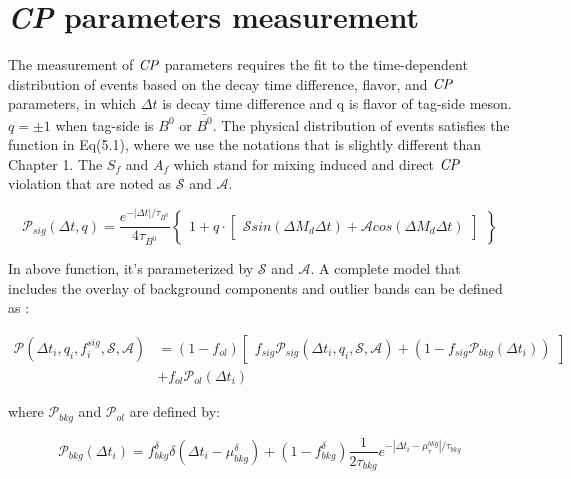 \chapter{\textit{CP} parameters measurement}
The measurement of $\it{CP}$ parameters requires the fit to the time-dependent distribution of events based on the decay time difference, flavor, and $\it{CP}$ parameters, in which $\Delta t$ is decay time difference and q is flavor of tag-side meson. $q = \pm 1$ when tag-side is $B^0$ or $\bar{B^0}$. The physical distribution of events satisfies the function in Eq(5.1), where we use the notations that is slightly different than Chapter 1. The $S_f$ and $A_f$ which stand for mixing induced and direct $\it{CP}$ violation that are noted as $\mathcal{S}$ and $\mathcal{A}$.

\begin{equation}
\mathcal{P}_{sig}(\Delta t, q ) = 
\frac{e^{-|\Delta t|/\tau_{B^0}}}{4\tau_{B^0}}
\begin{Bmatrix}
1 + q \cdot 
\begin{bmatrix}
\mathcal{S}sin(\Delta M_d \Delta t) + 
\mathcal{A}cos(\Delta M_d \Delta t)
\end{bmatrix}
\end{Bmatrix}
\end{equation}

In above function, it's parameterized by $\mathcal{S}$ and $\mathcal{A}$.
A complete model that includes the overlay of background components and outlier bands can be defined as : 

\begin{equation}
\begin{split}
\mathcal{P}(\Delta t_i,q_i,f_i^{sig},\mathcal{S},\mathcal{A})
&=(1-f_{ol})\begin{bmatrix}f_{sig}\mathcal{P}_{sig}(\Delta t_i,q_i,\mathcal{S},\mathcal{A})+(1-f_{sig}\mathcal{P}_{bkg}(\Delta t_i))
\end{bmatrix}\\
&+f_{ol}\mathcal{P}_{ol}(\Delta t_i)
\end{split}
\end{equation}

where $\mathcal{P}_{bkg}$ and $\mathcal{P}_{ol}$ are defined by: 

\begin{equation}
\mathcal{P}_{bkg} (\Delta t_i)=
f_{bkg}^{\delta}\delta(\Delta t_i-\mu_{bkg}^{\delta})+(1-f_{bkg}^{\delta})
\frac{1}{2\tau_{bkg}}e^{-|\Delta t_i-\mu_{\tau}^{bkg}|/\tau_{bkg}}
\end{equation}

